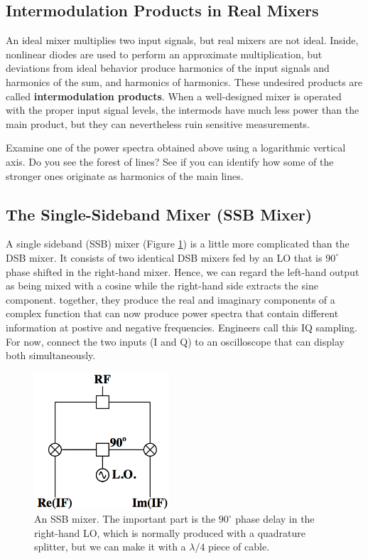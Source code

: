 \documentclass[11pt,preprint]{aastex}
\begin{document}
\subsection{Intermodulation Products in Real Mixers}

\noindent
An ideal mixer multiplies two input
signals, but real mixers are not ideal. Inside,
nonlinear diodes are used to perform an approximate multiplication, but
deviations from ideal behavior 
produce harmonics of the input signals and harmonics of the sum, and harmonics
of harmonics.
These undesired products are called
{\bf intermodulation products}.
When a well-designed
mixer is operated with the proper input signal levels, the intermods
have much less power than the main product, but they can nevertheless
ruin sensitive measurements.

Examine one of the power spectra obtained above using a logarithmic vertical
axis.
Do you see the forest of lines?
See if you can identify how some of the
stronger ones originate as harmonics of the main lines.

\subsection{ The Single-Sideband Mixer (SSB Mixer)}
\label{sectssb}

\noindent
A single sideband (SSB) mixer (Figure \ref{ssb}) is a
little more complicated than the DSB mixer. It consists of two identical
DSB mixers fed by an LO that is $90^\circ$ phase shifted in the right-hand mixer.
Hence, we can regard the left-hand output as being mixed with a cosine while
the right-hand side extracts the sine component.
together, they produce the real and imaginary components of a complex function
that can now produce power spectra that contain different information
at postive and negative frequencies.
Engineers call this IQ sampling. For now, connect the two inputs
(I and Q) to an oscilloscope that can display both simultaneously.

\begin{figure}[h!]
\begin{center}
  \includegraphics[height=2in]{ssbmixer.png}
\end{center}
\caption{\footnotesize An SSB mixer. The important part is the
  $90^\circ$ phase delay in the right-hand LO, which is normally
  produced with a quadrature splitter, but we can make it
  with a $\lambda/4$ piece of cable. \label{ssb}}
\end{figure}
\end{document}

